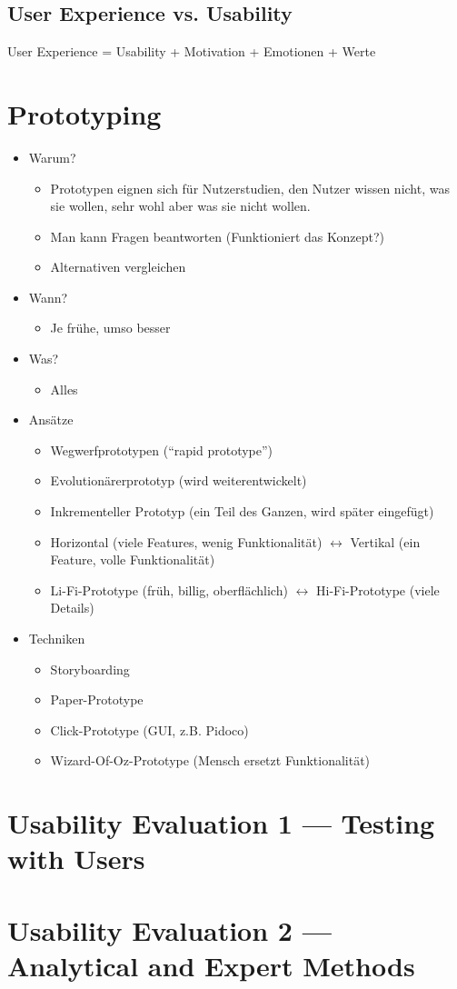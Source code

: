 \documentclass[a4paper,10pt]{article}
\begin{document}
\subsection{User Experience vs. Usability}

User Experience = Usability + Motivation + Emotionen + Werte


\section{Prototyping}
\begin{itemize}
	\item Warum?
	\begin{itemize}
		\item Prototypen eignen sich für Nutzerstudien, den Nutzer wissen nicht, was sie wollen, sehr wohl aber was sie nicht wollen.
		\item Man kann Fragen beantworten (Funktioniert das Konzept?)
		\item Alternativen vergleichen
	\end{itemize}
	\item Wann?
	\begin{itemize}
		\item Je frühe, umso besser
	\end{itemize}
	\item Was?
	\begin{itemize}
		\item Alles
	\end{itemize}
	\item Ansätze
	\begin{itemize}
		\item Wegwerfprototypen (“rapid prototype”)
		\item Evolutionärerprototyp (wird weiterentwickelt)
		\item Inkrementeller Prototyp (ein Teil des Ganzen, wird später eingefügt)
		\item Horizontal (viele Features, wenig Funktionalität) $\leftrightarrow$ Vertikal (ein Feature, volle Funktionalität)
		\item Li-Fi-Prototype (früh, billig, oberflächlich) $\leftrightarrow$ Hi-Fi-Prototype (viele Details)
	\end{itemize}
	\item Techniken
	\begin{itemize}
		\item Storyboarding
		\item Paper-Prototype
		\item Click-Prototype (GUI, z.B. Pidoco)
		\item Wizard-Of-Oz-Prototype (Mensch ersetzt Funktionalität)
	\end{itemize}
\end{itemize}

\section{Usability Evaluation 1 --- Testing with Users}

\section{Usability Evaluation 2 --- Analytical and Expert Methods}
\end{document}
